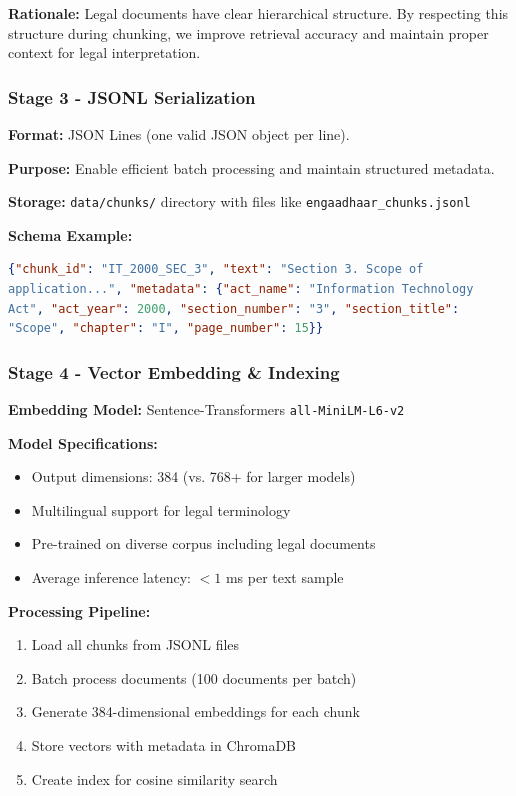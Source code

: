 \documentclass[12pt,a4paper]{article}
\begin{document}
\textbf{Rationale:} Legal documents have clear hierarchical structure. By respecting this structure during chunking, we improve retrieval accuracy and maintain proper context for legal interpretation.

\subsubsection{Stage 3 - JSONL Serialization}

\textbf{Format:} JSON Lines (one valid JSON object per line).

\textbf{Purpose:} Enable efficient batch processing and maintain structured metadata.

\textbf{Storage:} \texttt{data/chunks/} directory with files like \texttt{engaadhaar\_chunks.jsonl}

\textbf{Schema Example:}
\begin{lstlisting}[language=json]
{"chunk_id": "IT_2000_SEC_3", "text": "Section 3. Scope of 
application...", "metadata": {"act_name": "Information Technology 
Act", "act_year": 2000, "section_number": "3", "section_title": 
"Scope", "chapter": "I", "page_number": 15}}
\end{lstlisting}

\subsubsection{Stage 4 - Vector Embedding \& Indexing}

\textbf{Embedding Model:} Sentence-Transformers \texttt{all-MiniLM-L6-v2}

\textbf{Model Specifications:}
\begin{itemize}
    \item Output dimensions: 384 (vs. 768+ for larger models)
    \item Multilingual support for legal terminology
    \item Pre-trained on diverse corpus including legal documents
    \item Average inference latency: $<1$ ms per text sample
\end{itemize}

\textbf{Processing Pipeline:}
\begin{enumerate}
    \item Load all chunks from JSONL files
    \item Batch process documents (100 documents per batch)
    \item Generate 384-dimensional embeddings for each chunk
    \item Store vectors with metadata in ChromaDB
    \item Create index for cosine similarity search
\end{enumerate}
\end{document}
